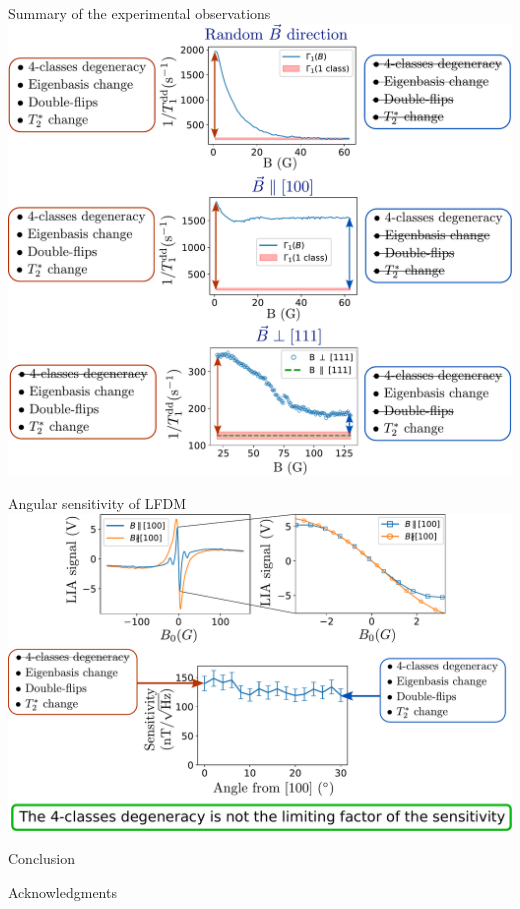 \documentclass{beamer}
\begin{document}
\begin{frame}{Summary of the experimental observations}
\centering
\includegraphics[width=\textwidth,height=0.9\textheight,keepaspectratio]{shema_summary_exp}
\end{frame}

\begin{frame}{Angular sensitivity of LFDM}
\centering
\includegraphics[width=\textwidth,height=0.9\textheight,keepaspectratio]{Slide_angular_sensitivity}
\end{frame}

\begin{frame}{Conclusion}

\end{frame}

\begin{frame}{Acknowledgments}

\end{frame}
\end{document}
